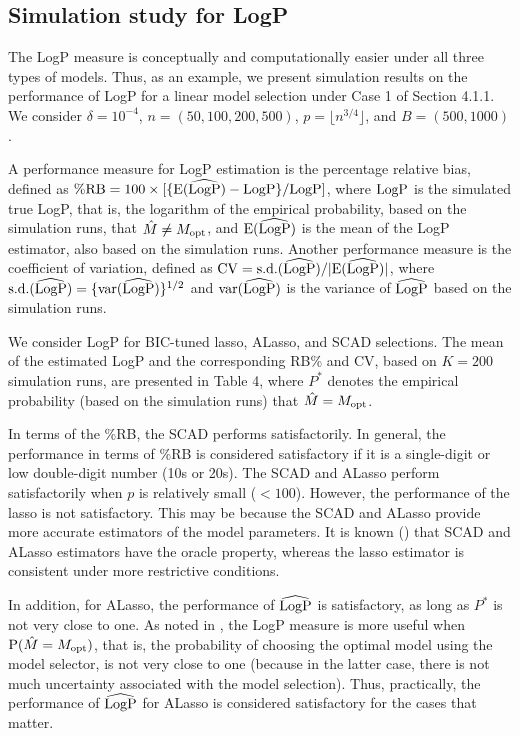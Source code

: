\documentclass[12pt]{article} %
\theoremstyle{definition}
\begin{document}
\subsection{Simulation study for LogP}
\hspace{4mm}
The LogP measure is conceptually and computationally easier under all three types of models. Thus, as an example, we present simulation results on the performance of LogP for a linear model selection under Case 1 of Section 4.1.1. We consider $\delta=10^{-4}$, $n=(50,100,200,500)$, $p=\lfloor n^{3/4}\rfloor$, and $B=(500,1000)$.

A performance measure for LogP estimation is the percentage relative bias, defined as
$\%{\rm RB}=100\times[\{{\rm E}(\widehat{\rm LogP})-{\rm LogP}\}/{\rm LogP}]$,
where ${\rm LogP}$ is the simulated true LogP, that is, the logarithm of the empirical probability, based on the simulation runs, that $\hat{M}\neq M_{\rm opt}$, and ${\rm E}(\widehat{\rm LogP})$ is the mean of the LogP estimator, also based on the simulation runs. Another performance measure is the coefficient of variation, defined as
${\rm CV}={\rm s.d.}(\widehat{\rm LogP})/|{\rm E}(\widehat{\rm LogP})|$,
where ${\rm s.d.}(\widehat{\rm LogP})=\{{\rm var}(\widehat{\rm LogP})\}^{1/2}$ and ${\rm var}(\widehat{\rm LogP})$ is the variance of $\widehat{\rm LogP}$ based on the simulation runs.

We consider LogP for BIC-tuned lasso, ALasso, and SCAD selections. The mean of the estimated LogP and the corresponding RB\% and CV, based on $K=200$ simulation runs, are presented in Table 4, where $P^{*}$ denotes the empirical probability (based on the simulation runs) that $\hat{M}=M_{\rm opt}$.

In terms of the \%RB, the SCAD performs satisfactorily. In general, the performance in terms of \%RB is considered satisfactory if it is a single-digit or low double-digit number (10s or 20s). The SCAD and ALasso perform satisfactorily when $p$ is relatively small ($<100$). However, the performance of the lasso is not satisfactory. This may be because the SCAD and ALasso provide more accurate estimators of the model parameters. It is known (\citet{fan2001,zou2006}) that SCAD and ALasso estimators have the oracle property, whereas the lasso estimator is consistent under more restrictive conditions.

In addition, for ALasso, the performance of $\widehat{\rm LogP}$ is satisfactory, as long as $P^{*}$ is not very close to one. As noted in \citet{Liu2021}, the LogP measure is more useful when ${\rm P}(\hat{M}=M_{\rm opt})$, that is, the probability of choosing the optimal model using the model selector, is not very close to one (because in the latter case, there is not much uncertainty associated with the model selection). Thus, practically, the performance of $\widehat{\rm LogP}$ for ALasso is considered satisfactory for the cases that matter.
\end{document}
